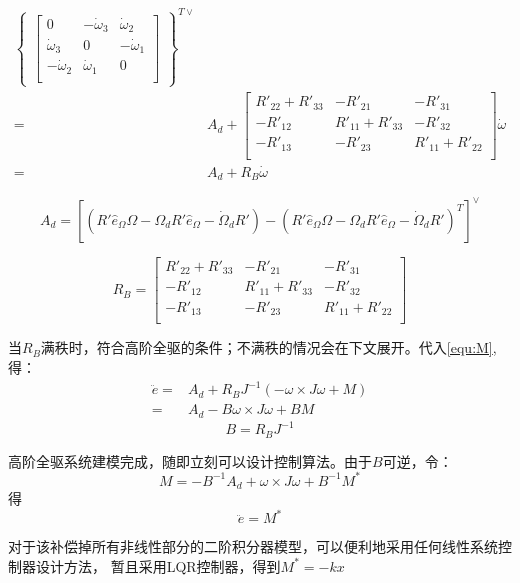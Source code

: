 $$\begin{aligned}
\begin{Bmatrix}
\begin{bmatrix}
        0 & -\dot\omega_3 &\dot\omega_2  \\
         \dot\omega_3& 0 &  -\dot\omega_1\\
         -\dot\omega_2&\dot\omega_1  & 0 \\
        \end{bmatrix}\end{Bmatrix}^{T\vee}\\
        =&A_d+\begin{bmatrix}
        R'_{22}+R'_{33} & -R'_{21} & -R'_{31} \\
         -R'_{12}& R'_{11}+R'_{33} & -R'_{32} \\
         -R'_{13}&- R'_{23} & R'_{11}+R'_{22} \\
        \end{bmatrix}\dot \omega\\
        =&A_d+R_B\dot \omega
        \end{aligned}  $$

        $$A_d=[(R' \hat e_\Omega \Omega  -\Omega_d R' \hat e_\Omega -\dot \Omega_d R')-(R' \hat e_\Omega \Omega  -\Omega_d R' \hat e_\Omega -\dot \Omega_d R')^T]^\vee$$

        $$R_B=\begin{bmatrix}
            R'_{22}+R'_{33} & -R'_{21} & -R'_{31} \\
             -R'_{12}& R'_{11}+R'_{33} & -R'_{32} \\
             -R'_{13}&- R'_{23} & R'_{11}+R'_{22} \\
            \end{bmatrix}$$

    当$R_B$满秩时，符合高阶全驱的条件；不满秩的情况会在下文展开。代入\ref{equ:M},得：
    $$\begin{aligned}
        \ddot e=&A_d+R_B J^{-1}(-\omega \times J\omega+M)\\
        =&A_d-B \omega\times J\omega +BM
        \end{aligned}$$
        $$B=R_BJ^{-1}$$

    高阶全驱系统建模完成，随即立刻可以设计控制算法。由于$B$可逆，令：
    $$M=-B^{-1} A_d+\omega \times J\omega +B^{-1}M^*$$
    得
    $$\ddot e=M^*$$

    对于该补偿掉所有非线性部分的二阶积分器模型，可以便利地采用任何线性系统控制器设计方法，
    暂且采用LQR控制器，得到$M^*=-kx$